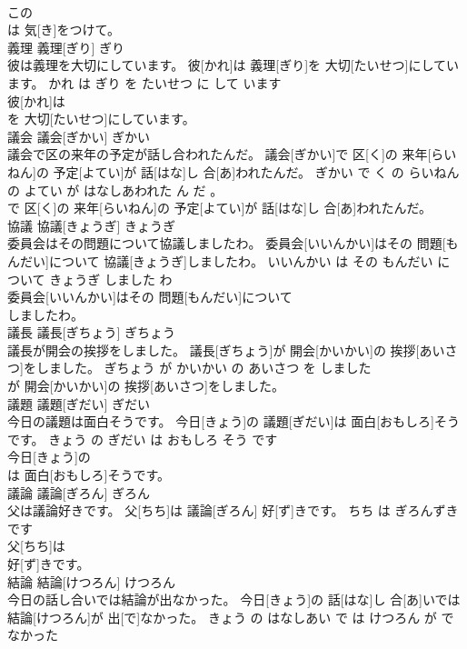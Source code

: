 \documentclass[8pt]{extreport}
\begin{document}
\begin{CJK}{UTF8}{min}
\\	この
\\	は 気[き]をつけて。			
\\	義理	義理[ぎり]	ぎり	
\\	彼は義理を大切にしています。	彼[かれ]は 義理[ぎり]を 大切[たいせつ]にしています。	かれ は ぎり を たいせつ に して います	
\\	彼[かれ]は
\\	を 大切[たいせつ]にしています。			
\\	議会	議会[ぎかい]	ぎかい	
\\	議会で区の来年の予定が話し合われたんだ。	議会[ぎかい]で 区[く]の 来年[らいねん]の 予定[よてい]が 話[はな]し 合[あ]われたんだ。	ぎかい で く の らいねん の よてい が はなしあわれた ん だ 。	
\\	で 区[く]の 来年[らいねん]の 予定[よてい]が 話[はな]し 合[あ]われたんだ。			
\\	協議	協議[きょうぎ]	きょうぎ	
\\	委員会はその問題について協議しましたわ。	委員会[いいんかい]はその 問題[もんだい]について 協議[きょうぎ]しましたわ。	いいんかい は その もんだい に ついて きょうぎ しました わ	
\\	委員会[いいんかい]はその 問題[もんだい]について
\\	しましたわ。			
\\	議長	議長[ぎちょう]	ぎちょう	
\\	議長が開会の挨拶をしました。	議長[ぎちょう]が 開会[かいかい]の 挨拶[あいさつ]をしました。	ぎちょう が かいかい の あいさつ を しました	
\\	が 開会[かいかい]の 挨拶[あいさつ]をしました。			
\\	議題	議題[ぎだい]	ぎだい	
\\	今日の議題は面白そうです。	今日[きょう]の 議題[ぎだい]は 面白[おもしろ]そうです。	きょう の ぎだい は おもしろ そう です	
\\	今日[きょう]の
\\	は 面白[おもしろ]そうです。			
\\	議論	議論[ぎろん]	ぎろん	
\\	父は議論好きです。	父[ちち]は 議論[ぎろん] 好[ず]きです。	ちち は ぎろんずき です	
\\	父[ちち]は
\\	好[ず]きです。			
\\	結論	結論[けつろん]	けつろん	
\\	今日の話し合いでは結論が出なかった。	今日[きょう]の 話[はな]し 合[あ]いでは 結論[けつろん]が 出[で]なかった。	きょう の はなしあい で は けつろん が でなかった	

\end{CJK}
\end{document}
